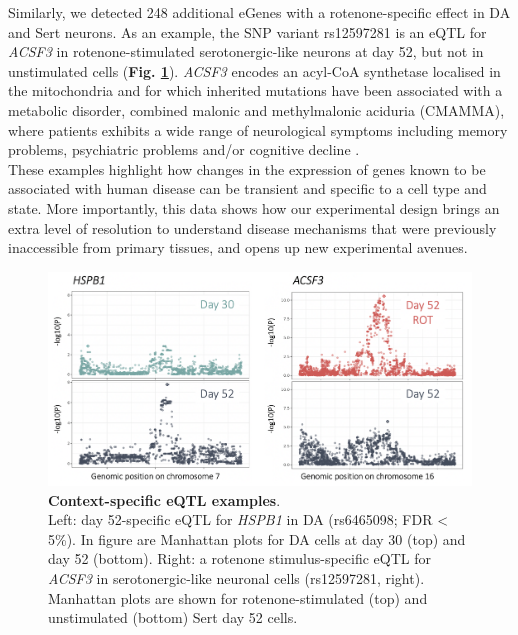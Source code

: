 Similarly, we detected 248 additional eGenes with a rotenone-specific effect in DA and Sert neurons. 
As an example, the SNP variant rs12597281 is an eQTL for \textit{ACSF3} in rotenone-stimulated serotonergic-like neurons at day 52, but not in unstimulated cells (\textbf{Fig. \ref{fig:neuroseq_eqtl_examples}}). 
\textit{ACSF3} encodes an acyl-CoA synthetase localised in the mitochondria and for which inherited mutations have been associated with a metabolic disorder, combined malonic and methylmalonic aciduria (CMAMMA), where patients exhibits a wide range of neurological symptoms including memory problems, psychiatric problems and/or cognitive decline \cite{tucci2020brain}.\\

These examples highlight how changes in the expression of genes known to be associated with human disease can be transient and specific to a cell type and state. 
More importantly, this data shows how our experimental design brings an extra level of resolution to understand disease mechanisms that were previously inaccessible from primary tissues, and opens up new experimental avenues. \\


\begin{figure}[h]
\includegraphics[width=16cm]{Chapter5/Fig/neuroseq_eqtl_examples.png}
\caption[Context-specific eQTL examples]{\textbf{Context-specific eQTL examples}.\\
Left: day 52-specific eQTL for \textit{HSPB1} in DA (rs6465098; FDR < 5\%). 
In figure are Manhattan plots for DA cells at day 30 (top) and day 52 (bottom). 
Right: a rotenone stimulus-specific eQTL for \textit{ACSF3} in serotonergic-like neuronal cells (rs12597281, right). 
Manhattan plots are shown for rotenone-stimulated (top) and unstimulated (bottom) Sert day 52 cells.}
\label{fig:neuroseq_eqtl_examples}
\end{figure}

